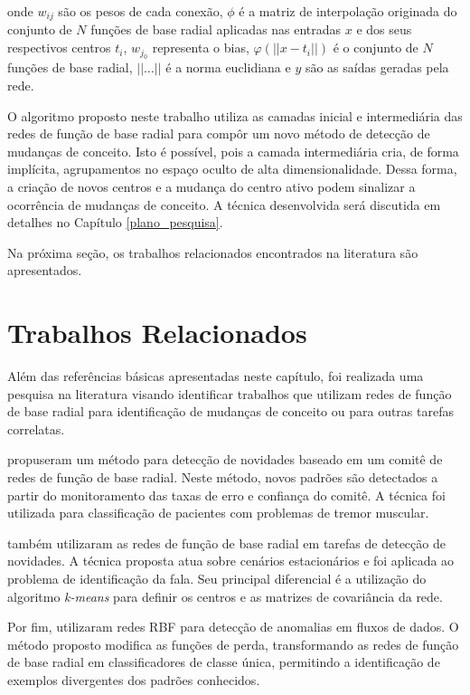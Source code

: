 \documentclass[qual, classic, a4paper]{ufbathesis}
\begin{document}
onde $w_{ij}$ são os pesos de cada conexão, $\phi$ é a matriz de interpolação originada do conjunto de $N$ funções
de base radial aplicadas nas entradas $x$ e dos seus respectivos centros $t_i$,
$w_{j_0}$ representa o bias, $\varphi (||{{x}}-{{t}}_{i}||)$ é o conjunto de $N$ funções de base radial,
$||\ldots||$ é a norma euclidiana e $y$ são as saídas geradas pela rede.

O algoritmo proposto neste trabalho utiliza as camadas inicial e intermediária das redes de função de base radial para compôr um novo método de detecção de mudanças de conceito.
Isto é possível, pois a camada intermediária cria, de forma implícita, agrupamentos no espaço oculto de alta dimensionalidade.
Dessa forma, a criação de novos centros e a mudança do centro ativo podem sinalizar a ocorrência de mudanças de conceito.
A técnica desenvolvida será discutida em detalhes no Capítulo \ref{plano_pesquisa}.

Na próxima seção, os trabalhos relacionados encontrados na literatura são apresentados.

\section{Trabalhos Relacionados}

Além das referências básicas apresentadas neste capítulo, foi realizada uma pesquisa na literatura visando identificar trabalhos 
que utilizam redes de função de base radial para identificação de mudanças de conceito ou para outras tarefas correlatas.

 propuseram um método para detecção de novidades baseado em um comitê de redes de função de base radial.
Neste método, novos padrões são detectados a partir do monitoramento das taxas de erro e confiança do comitê.
A técnica foi utilizada para classificação de pacientes com problemas de tremor muscular.

 também utilizaram as redes de função de base radial em tarefas de detecção de novidades.
A técnica proposta atua sobre cenários estacionários e foi aplicada ao problema de identificação da fala.
Seu principal diferencial é a utilização do algoritmo \textit{k-means} para definir os centros e as matrizes de covariância da rede.

Por fim,  utilizaram redes RBF para detecção de anomalias em fluxos de dados.
O método proposto modifica as funções de perda, transformando as redes de função de base radial em classificadores de classe única, 
permitindo a identificação de exemplos divergentes dos padrões conhecidos.
\end{document}

